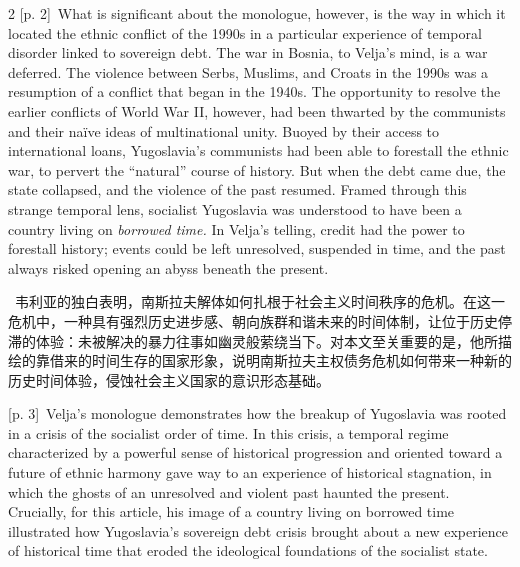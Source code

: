 \documentclass[10pt,a4paper]{article}
\begin{document}
\begin{paracol}{2}
{\scriptsize\color{gray} [p. 2]}\ What is significant about the monologue, however, is the way in which it located the ethnic conflict of the 1990s in a particular experience of temporal disorder linked to sovereign debt. The war in Bosnia, to Velja’s mind, is a war deferred. The violence between Serbs, Muslims, and Croats in the 1990s was a resumption of a conflict that began in the 1940s. The opportunity to resolve the earlier conflicts of World War II, however, had been thwarted by the communists and their naïve ideas of multinational unity. Buoyed by their access to international loans, Yugoslavia’s communists had been able to forestall the ethnic war, to pervert the “natural” course of history. But when the debt came due, the state collapsed, and the violence of the past resumed. Framed through this strange temporal lens, socialist Yugoslavia was understood to have been a country living on \textit{borrowed time.} In Velja’s telling, credit had the power to forestall history; events could be left unresolved, suspended in time, and the past always risked opening an abyss beneath the present.\par
\switchcolumn*
{\scriptsize\color{gray} [p. 3]}\ 韦利亚的独白表明，南斯拉夫解体如何扎根于社会主义时间秩序的危机。在这一危机中，一种具有强烈历史进步感、朝向族群和谐未来的时间体制，让位于历史停滞的体验：未被解决的暴力往事如幽灵般萦绕当下。对本文至关重要的是，他所描绘的靠借来的时间生存的国家形象，说明南斯拉夫主权债务危机如何带来一种新的历史时间体验，侵蚀社会主义国家的意识形态基础。\par
\switchcolumn
{\scriptsize\color{gray} [p. 3]}\ Velja’s monologue demonstrates how the breakup of Yugoslavia was rooted in a crisis of the socialist order of time. In this crisis, a temporal regime characterized by a powerful sense of historical progression and oriented toward a future of ethnic harmony gave way to an experience of historical stagnation, in which the ghosts of an unresolved and violent past haunted the present. Crucially, for this article, his image of a country living on borrowed time illustrated how Yugoslavia’s sovereign debt crisis brought about a new experience of historical time that eroded the ideological foundations of the socialist state.\par
\switchcolumn*

\end{paracol}
\end{document}
